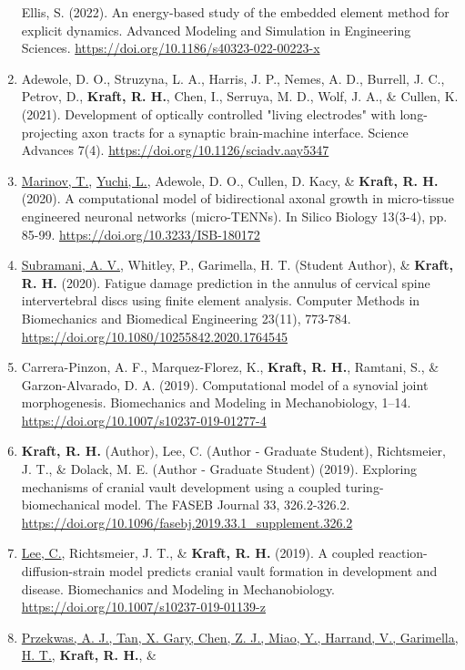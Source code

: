 \documentclass[a4paper,10pt]{article}
\begin{document}
\begin{enumerate}
 Ellis, S. (2022). An energy-based study of the embedded element method for explicit dynamics. Advanced Modeling and Simulation in Engineering Sciences. \url{https://doi.org/10.1186/s40323-022-00223-x}
  \item	Adewole, D. O., Struzyna, L. A., Harris, J. P., Nemes, A. D., Burrell, J. C., Petrov, D., \textbf{\textbf{Kraft,} R. H.}, Chen, I., Serruya, M. D., Wolf, J. A., \&
 Cullen, K. (2021). Development of optically controlled "living electrodes" with long-projecting axon tracts for a synaptic brain-machine interface. Science Advances 7(4). \url{https://doi.org/10.1126/sciadv.aay5347}
  \item	\underline{Marinov, T.}, \underline{Yuchi, L.}, Adewole, D. O., Cullen, D. Kacy, \&
 \textbf{\textbf{Kraft,} R. H.} (2020). A computational model of bidirectional axonal growth in micro-tissue engineered neuronal networks (micro-TENNs). In Silico Biology 13(3-4), pp. 85-99. \url{https://doi.org/10.3233/ISB-180172}
  \item	\underline{Subramani, A. V.}, Whitley, P., Garimella, H. T. (Student Author), \&
 \textbf{\textbf{Kraft,} R. H.} (2020). Fatigue damage prediction in the annulus of cervical spine intervertebral discs using finite element analysis. Computer Methods in Biomechanics and Biomedical Engineering 23(11), 773-784. \url{https://doi.org/10.1080/10255842.2020.1764545}
  \item	Carrera-Pinzon, A. F., Marquez-Florez, K., \textbf{\textbf{Kraft,} R. H.}, Ramtani, S., \&
 Garzon-Alvarado, D. A. (2019). Computational model of a synovial joint morphogenesis. Biomechanics and Modeling in Mechanobiology, 1--14. \url{https://doi.org/10.1007/s10237-019-01277-4}
  \item	\textbf{\textbf{Kraft,} R. H.} (Author), Lee, C. (Author - Graduate Student), Richtsmeier, J. T., \&
 Dolack, M. E. (Author - Graduate Student) (2019). Exploring mechanisms of cranial vault development using a coupled turing-biomechanical model. The FASEB Journal 33, 326.2-326.2. \url{https://doi.org/10.1096/fasebj.2019.33.1_supplement.326.2}
  \item	\underline{Lee, C.}, Richtsmeier, J. T., \&
 \textbf{\textbf{Kraft,} R. H.} (2019). A coupled reaction-diffusion-strain model predicts cranial vault formation in development and disease. Biomechanics and Modeling in Mechanobiology. \url{https://doi.org/10.1007/s10237-019-01139-z}
  \item	\underline{Przekwas, A. J., Tan, X. Gary, Chen, Z. J., Miao, Y., Harrand, V., Garimella, H. T.}, \textbf{\textbf{Kraft,} R. H.}, \&

\end{enumerate}
\end{document}
